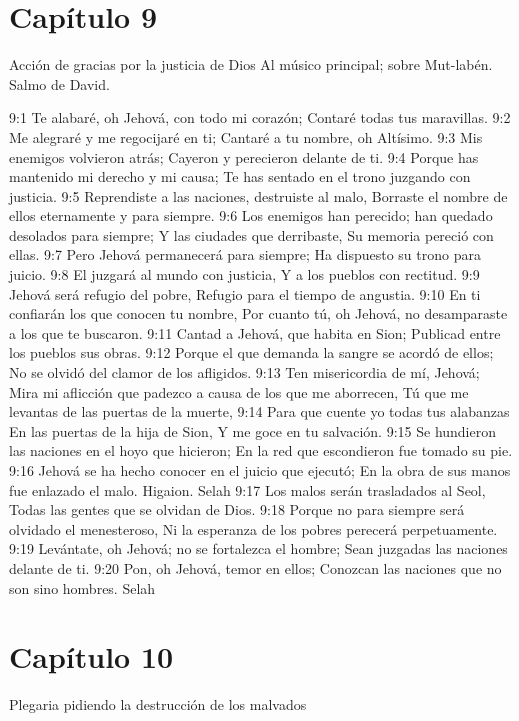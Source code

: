 \section*{Capítulo 9}
Acción de gracias por la justicia de Dios 
Al músico principal; sobre Mut-labén. Salmo de David. 

9:1 Te alabaré, oh Jehová, con todo mi corazón; 
Contaré todas tus maravillas. 
9:2 Me alegraré y me regocijaré en ti; 
Cantaré a tu nombre, oh Altísimo. 
9:3 Mis enemigos volvieron atrás; 
Cayeron y perecieron delante de ti. 
9:4 Porque has mantenido mi derecho y mi causa; 
Te has sentado en el trono juzgando con justicia. 
9:5 Reprendiste a las naciones, destruiste al malo, 
Borraste el nombre de ellos eternamente y para siempre. 
9:6 Los enemigos han perecido; han quedado desolados para siempre; 
Y las ciudades que derribaste, 
Su memoria pereció con ellas. 
9:7 Pero Jehová permanecerá para siempre; 
Ha dispuesto su trono para juicio. 
9:8 El juzgará al mundo con justicia, 
Y a los pueblos con rectitud. 
9:9 Jehová será refugio del pobre, 
Refugio para el tiempo de angustia. 
9:10 En ti confiarán los que conocen tu nombre, 
Por cuanto tú, oh Jehová, no desamparaste a los que te buscaron. 
9:11 Cantad a Jehová, que habita en Sion; 
Publicad entre los pueblos sus obras. 
9:12 Porque el que demanda la sangre se acordó de ellos; 
No se olvidó del clamor de los afligidos. 
9:13 Ten misericordia de mí, Jehová; 
Mira mi aflicción que padezco a causa de los que me aborrecen, 
Tú que me levantas de las puertas de la muerte, 
9:14 Para que cuente yo todas tus alabanzas 
En las puertas de la hija de Sion, 
Y me goce en tu salvación. 
9:15 Se hundieron las naciones en el hoyo que hicieron; 
En la red que escondieron fue tomado su pie. 
9:16 Jehová se ha hecho conocer en el juicio que ejecutó; 
En la obra de sus manos fue enlazado el malo. Higaion. Selah 
9:17 Los malos serán trasladados al Seol, 
Todas las gentes que se olvidan de Dios. 
9:18 Porque no para siempre será olvidado el menesteroso, 
Ni la esperanza de los pobres perecerá perpetuamente. 
9:19 Levántate, oh Jehová; no se fortalezca el hombre; 
Sean juzgadas las naciones delante de ti. 
9:20 Pon, oh Jehová, temor en ellos; 
Conozcan las naciones que no son sino hombres. Selah 
\section*{Capítulo 10}
Plegaria pidiendo la destrucción de los malvados 

